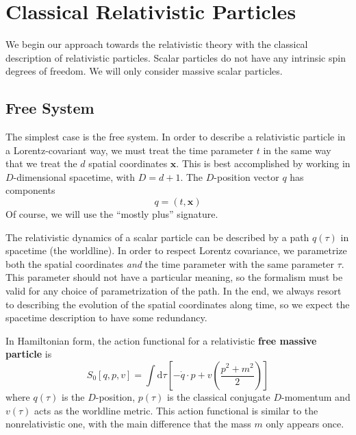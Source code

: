 \chapter{Classical Relativistic Particles\label{ChParticles}}
We begin our approach towards the relativistic theory with the classical description of relativistic particles. Scalar particles do not have any intrinsic spin degrees of freedom. We will only consider massive scalar particles.
\section{Free System}
The simplest case is the free system. In order to describe a relativistic particle in a Lorentz-covariant way, we must treat the time parameter $t$ in the same way that we treat the $d$ spatial coordinates $\mathbf{x}$. This is best accomplished by working in $D$-dimensional spacetime, with $D = d + 1$. The $D$-position vector $q$ has components
\begin{equation}
	q = (t, \mathbf{x})
\end{equation}
Of course, we will use the ``mostly plus'' signature.

The relativistic dynamics of a scalar particle can be described by a path $q(\tau)$ in spacetime (the worldline). In order to respect Lorentz covariance, we parametrize both the spatial coordinates \textit{and} the time parameter with the same parameter $\tau$. This parameter should not have a particular meaning, so the formalism must be valid for any choice of parametrization of the path. In the end, we always resort to describing the evolution of the spatial coordinates along time, so we expect the spacetime description to have some redundancy.

In Hamiltonian form, the action functional for a relativistic \textbf{free massive particle} is
\begin{equation}
	S_{0}[q, p, v] = \int \mathrm{d}\tau \left[- \dot{q} \cdot p + v \left( \frac{p^{2} + m^{2}}{2} \right) \right] \label{S0FreeMassivePQ}
\end{equation}
where $q(\tau)$ is the $D$-position, $p(\tau)$ is the classical conjugate $D$-momentum and $v(\tau)$ acts as the worldline metric. This action functional is similar to the nonrelativistic one, with the main difference that the mass $m$ only appears once.

